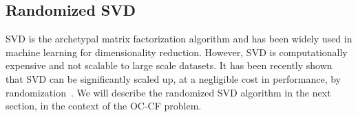 




%

\subsection{Randomized SVD}
SVD is the archetypal matrix factorization algorithm and has been widely used in machine learning for dimensionality reduction. However, SVD is computationally expensive and not scalable to large scale datasets. It has been recently shown that SVD can be significantly scaled up, at a negligible cost in performance, by randomization~\citep{halko2011}. We will describe the randomized SVD algorithm in the next section, in the context of the OC-CF problem.

